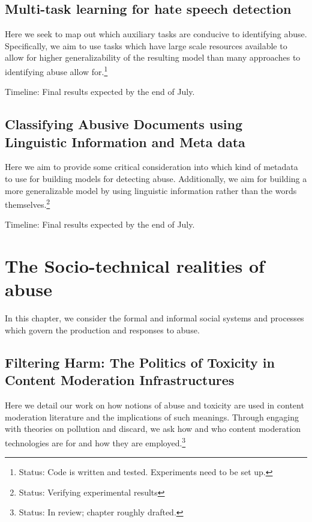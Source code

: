 {\subsection{Multi-task learning for hate speech detection}
Here we seek to map out which auxiliary tasks are conducive to identifying abuse. Specifically, we aim to use tasks which have large scale resources available to allow for higher generalizability of the resulting model than many approaches to identifying abuse allow for.\footnote{Status: Code is written and tested. Experiments need to be set up.}

Timeline: Final results expected by the end of July.

\subsection{Classifying Abusive Documents using Linguistic Information and Meta data}
Here we aim to provide some critical consideration into which kind of metadata to use for building models for detecting abuse. Additionally, we aim for building a more generalizable model by using linguistic information rather than the words themselves.\footnote{Status: Verifying experimental results}

Timeline: Final results expected by the end of July.

\section{The Socio-technical realities of abuse}

In this chapter, we consider the formal and informal social systems and processes which govern the production and responses to abuse.

\subsection{Filtering Harm: The Politics of Toxicity in Content Moderation Infrastructures}
Here we detail our work on how notions of abuse and toxicity are used in content moderation literature and the implications of such meanings. Through engaging with theories on pollution and discard, we ask how and who content moderation technologies are for and how they are employed.\footnote{Status: In review; chapter roughly drafted.}

}
